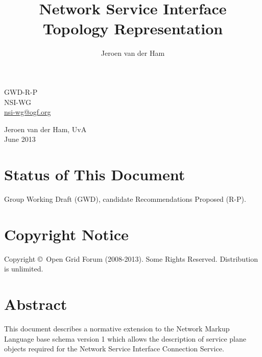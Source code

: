\documentclass[12pt]{article}  %
\title{Network Service Interface Topology Representation}
\author{Jeroen van der Ham}
\newcommand{\headerstyle}{\sffamily} %
\newcommand{\ifnonempty}[2]{\ifthenelse{\isundefined{#1}}{}{\ifthenelse{\equal{#1}{}}{}{#2}}}
\newcommand{\authorsshort}{Jeroen van der Ham, UvA}
\newcommand{\publicationdate}{June 2013}  %
\newcommand{\copyrightyears}{2008-2013}  %
\newcommand{\docseries}{GWD-R-P}  %
\begin{document}
{\noindent
\begin{minipage}[t]{1.5in}
\headerstyle
\docseries \\
NSI-WG \\
\href{mailto:nsi-wg@ogf.org}{nsi-wg@ogf.org}
\end{minipage}
\hfill
\raggedleft
\begin{minipage}[t]{4.5in}
\raggedleft
\headerstyle
\authorsshort \\
\vspace{1em}
\publicationdate \\
\ifnonempty{\revisiondate}{Revised \revisiondate \\}
\end{minipage}
}

\vspace{1em}
\begin{center}
\makeatletter
\Large\bf\textsf \@title
\makeatother
\end{center}


\section*{Status of This Document}

Group Working Draft (GWD), candidate Recommendations Proposed (R-P).


% 

\section*{Copyright Notice}

Copyright \copyright \ Open Grid Forum (\copyrightyears).  Some Rights Reserved.  
Distribution is unlimited.

\section*{Abstract}

This document describes a normative extension to the Network Markup Language base schema version 1 
which allows the description of service plane objects required for the Network Service Interface
Connection Service.
\end{document}
